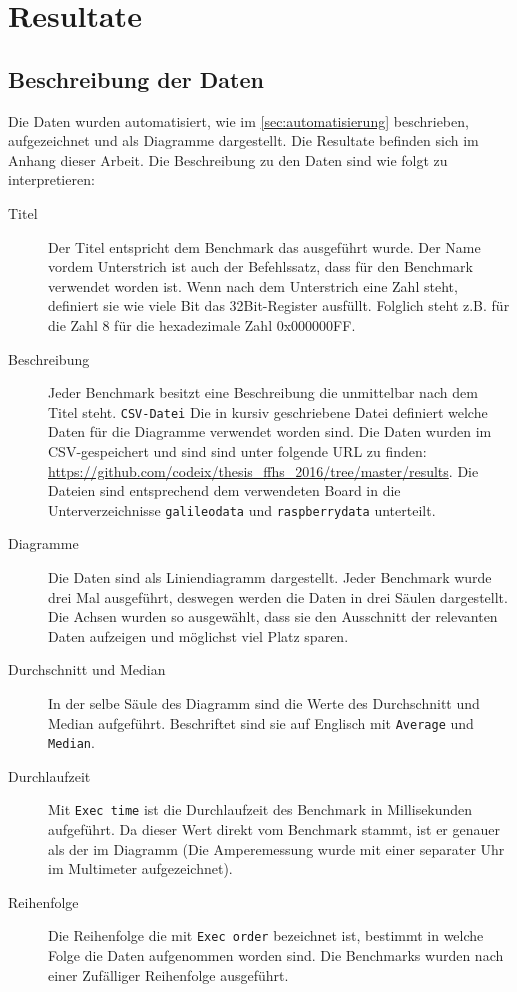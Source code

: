 \chapter{Resultate}

\section{Beschreibung der Daten}

Die Daten wurden automatisiert, wie im \autoref{sec:automatisierung} beschrieben, aufgezeichnet und als Diagramme dargestellt. Die Resultate befinden sich im Anhang dieser Arbeit. Die Beschreibung zu den Daten sind wie folgt zu interpretieren:

\begin{description}
\item[Titel]
Der Titel entspricht dem Benchmark das ausgeführt wurde. Der Name vordem Unterstrich ist auch der Befehlssatz, dass für den Benchmark verwendet worden ist. Wenn nach dem Unterstrich eine Zahl steht, definiert sie wie viele Bit das 32Bit-Register ausfüllt. Folglich steht z.B. für die Zahl 8 für die hexadezimale Zahl 0x000000FF.
\item[Beschreibung]
Jeder Benchmark besitzt eine Beschreibung die unmittelbar nach dem Titel steht.
\texttt{CSV-Datei} Die in kursiv geschriebene Datei definiert welche Daten für die Diagramme verwendet worden sind. Die Daten wurden im CSV-gespeichert und sind sind unter folgende URL zu finden: \url{https://github.com/codeix/thesis_ffhs_2016/tree/master/results}. Die Dateien sind entsprechend dem verwendeten Board in die Unterverzeichnisse \texttt{galileodata} und \texttt{raspberrydata} unterteilt. 
\item[Diagramme]
Die Daten sind als Liniendiagramm dargestellt. Jeder Benchmark wurde drei Mal ausgeführt, deswegen werden die Daten in drei Säulen dargestellt. Die Achsen wurden so ausgewählt, dass sie den Ausschnitt der relevanten Daten aufzeigen und möglichst viel Platz sparen.
\item[Durchschnitt und Median]
In der selbe Säule des Diagramm sind die Werte des Durchschnitt und Median aufgeführt. Beschriftet sind sie auf Englisch mit \texttt{Average} und \texttt{Median}.
\item[Durchlaufzeit]
Mit \texttt{Exec time} ist die Durchlaufzeit des Benchmark in Millisekunden aufgeführt. Da dieser Wert direkt vom Benchmark stammt, ist er genauer als der im Diagramm (Die Amperemessung wurde mit einer separater Uhr im Multimeter aufgezeichnet).
\item[Reihenfolge] Die Reihenfolge die mit \texttt{Exec order} bezeichnet ist, bestimmt in welche Folge die Daten aufgenommen worden sind. Die Benchmarks wurden nach einer Zufälliger Reihenfolge ausgeführt.

\end{description}



